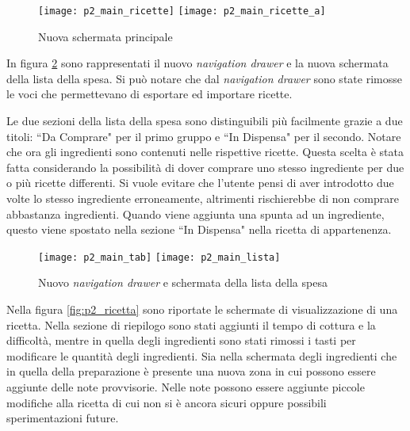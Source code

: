 \begin{figure}[ht]
  \begin{center}
    \texttt{[image: p2\_main\_ricette]}
    \texttt{[image: p2\_main\_ricette\_a]}
    \caption{Nuova schermata principale}
    \label{fig:p2_main_ricette}
  \end{center}
\end{figure}

In figura \ref{fig:p2_main_lista_della_spesa} sono rappresentati il nuovo \textit{navigation drawer} e la nuova schermata della lista della spesa.
Si può notare che dal \textit{navigation drawer} sono state rimosse le voci che permettevano di esportare ed importare ricette.

Le due sezioni della lista della spesa sono distinguibili più facilmente grazie a due titoli: ``Da Comprare" per il primo gruppo e ``In Dispensa" per il secondo.
Notare che ora gli ingredienti sono contenuti nelle rispettive ricette.
Questa scelta è stata fatta considerando la possibilità di dover comprare uno stesso ingrediente per due o più ricette differenti.
Si vuole evitare che l'utente pensi di aver introdotto due volte lo stesso ingrediente erroneamente, altrimenti rischierebbe di non comprare abbastanza ingredienti.
Quando viene aggiunta una spunta ad un ingrediente, questo viene spostato nella sezione ``In Dispensa" nella ricetta di appartenenza.

\begin{figure}[ht]
  \begin{center}
    \texttt{[image: p2\_main\_tab]}
    \texttt{[image: p2\_main\_lista]}
    \caption{Nuovo \textit{navigation drawer} e schermata della lista della spesa}
    \label{fig:p2_main_lista_della_spesa}
  \end{center}
\end{figure}

Nella figura \ref{fig:p2_ricetta} sono riportate le schermate di visualizzazione di una ricetta.
Nella sezione di riepilogo sono stati aggiunti il tempo di cottura e la difficoltà, mentre in quella degli ingredienti sono stati rimossi i tasti per modificare le quantità degli ingredienti.
Sia nella schermata degli ingredienti che in quella della preparazione è presente una nuova zona in cui possono essere aggiunte delle note provvisorie.
Nelle note possono essere aggiunte piccole modifiche alla ricetta di cui non si è ancora sicuri oppure possibili sperimentazioni future.

